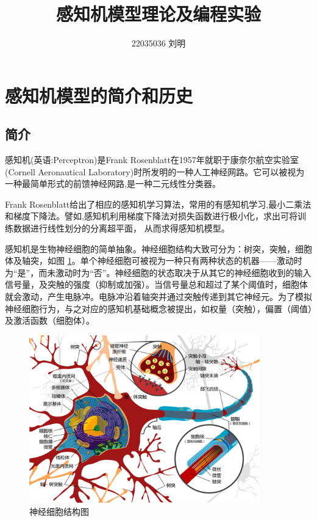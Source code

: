 \documentclass[a4paper,8pt]{article}
\author{22035036 刘明}
\title{感知机模型理论及编程实验}
\begin{document}
\maketitle

\tableofcontents

\newpage

\section{感知机模型的简介和历史}
\label{sec:introduction}
\subsection{简介}
感知机(英语:Perceptron)是Frank Rosenblatt在1957年就职于康奈尔航空实验室(Cornell Aeronautical Laboratory)时所发明的一种人工神经网路。它可以被视为一种最简单形式的前馈神经网路,是一种二元线性分类器。

Frank Rosenblatt给出了相应的感知机学习算法，常用的有感知机学习,最小二乘法和梯度下降法。譬如,感知机利用梯度下降法对损失函数进行极小化，求出可将训练数据进行线性划分的分离超平面，
从而求得感知机模型。

感知机是生物神经细胞的简单抽象。神经细胞结构大致可分为：树突，突触，细胞体及轴突，如图 \ref{fig:neuron}。单个神经细胞可被视为一种只有两种状态的机器——激动时为“是”，而未激动时为“否”。神经细胞的状态取决于从其它的神经细胞收到的输入信号量，及突触的强度（抑制或加强）。当信号量总和超过了某个阈值时，细胞体就会激动，产生电脉冲。电脉冲沿着轴突并通过突触传递到其它神经元。为了模拟神经细胞行为，与之对应的感知机基础概念被提出，如权量（突触），偏置（阈值）及激活函数（细胞体）。

\begin{figure}[htbp]
\centering
\includegraphics[width=10cm]{./fig/神经细胞结构图.png}
\caption{ 神经细胞结构图}\label{fig:neuron}
\end{figure}
\end{document}
